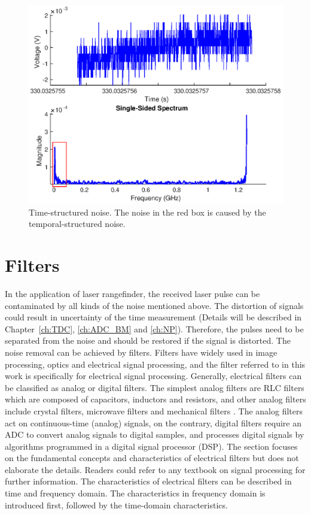 \begin{figure}[t!p]
\centering
\includegraphics[width=.8\textwidth]{figures/chapter_background/Noise_timeStruct_sig_FFT_RampNoise.eps}
\caption{Time-structured noise. The noise in the red box is caused by the temporal-structured noise.}
\label{fig:backgrd_Noise_time}
\end{figure}

\section{Filters}
In the application of laser rangefinder, the received laser pulse can be contaminated by all kinds of the noise mentioned above. The distortion of signals could result in uncertainty of the time measurement (Details will be described in Chapter~\ref{ch:TDC}, \ref{ch:ADC_BM} and \ref{ch:NP}). Therefore, the pulses need to be separated from the noise and should be restored if the signal is distorted. The noise removal can be achieved by filters. Filters have widely used in image processing, optics and electrical signal processing, and the filter referred to in this work is specifically for electrical signal processing. Generally, electrical filters can be classified as analog or digital filters. The simplest analog filters are RLC filters which are composed of capacitors, inductors and resistors, and other analog filters include crystal filters, microwave filters and mechanical filters \etc. The analog filters act on continuous-time (analog) signals, on the contrary, digital filters require an ADC to convert analog signals to digital samples, and processes digital signals by algorithms programmed in a digital signal processor (DSP). The section focuses on the fundamental concepts and characteristics of electrical filters but does not elaborate the details. Readers could refer to any textbook on signal processing for further information. The characteristics of electrical filters can be described in time and frequency domain. The characteristics in frequency domain is introduced first, followed by the time-domain characteristics.
